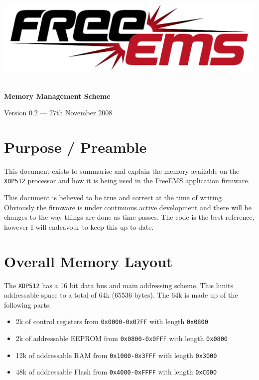 \documentclass[12pt,a4wide,titlepage]{article}
\begin{document}
\begin{titlepage} 
\begin{center}

\includegraphics[width=1\textwidth]{./logos/freeems}\\[1cm] \vfill

\HRule \\[0.8cm]
{ \huge \bfseries Memory Management Scheme}\\[0.4cm]
\HRule \vfill

\Large 

{\large Version 0.2 --- 27th November 2008}



\section {Purpose / Preamble} 

This document exists to summarise and explain the memory available on the
\texttt{XDP512} processor and how it is being used in the FreeEMS application
firmware.

This document is believed to be true and correct at the time of writing.
Obviously the firmware is under continuous active development and there will
be changes to the way things are done as time passes. The code is the best
reference, however I will endeavour to keep this up to date.




\section{Overall Memory Layout}

The \texttt{XDP512} has a 16 bit data bus and main addressing scheme. This
limits addressable space to a total of 64k (65536 bytes). The 64k is made up of
the following parts:

\begin{itemize}
\item 2k of control registers from \texttt{0x0000-0x07FF} with length \texttt{0x0800}
\item 2k of addressable EEPROM from \texttt{0x0800-0x0FFF} with length \texttt{0x0800}
\item 12k of addressable RAM from \texttt{0x1000-0x3FFF} with length \texttt{0x3000}
\item 48k of addressable Flash from \texttt{0x4000-0xFFFF} with length \texttt{0xC000}
\end{itemize}


\end{center}
\end{titlepage}
\end{document}
